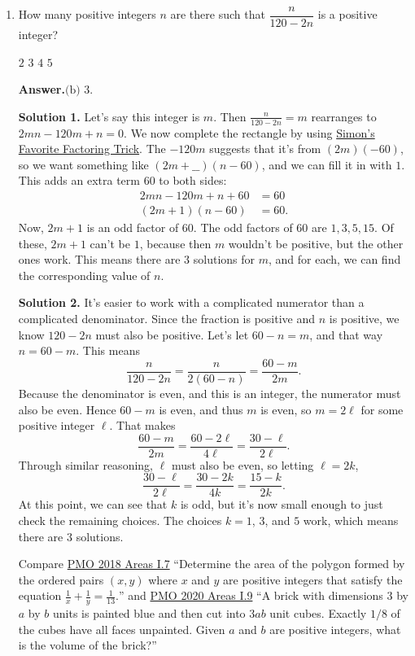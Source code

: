 \documentclass[11pt,paper=letter]{scrartcl}
\newcommand{\ansb}[2]{{\sffamily \bfseries Answer.}\;\(\boxed{\text{(#1) #2}}\).}
\newcommand{\soln}[1]{{\sffamily \bfseries Solution #1.}\;}
\newenvironment{rem}%
{\noindent \ignorespaces \small \sffamily \sansmath {\bfseries Remark.}}%
{\ignorespacesafterend}
\begin{document}
\begin{enumerate}[align=left,leftmargin=*]
\item How many positive integers $n$ are there such that $\dfrac{n}{120-2n}$ is a positive integer?

\fourch
{$2$}
{$3$}
{$4$}
{$5$}

\ansb{b}{$3$}

\soln1 Let's say this integer is $m$. Then $\frac{n}{120 - 2n} = m$ rearranges to $2mn - 120m + n = 0.$ We now complete the rectangle by using \href{https://artofproblemsolving.com/wiki/index.php/Simon%27s_Favorite_Factoring_Trick}{Simon's Favorite Factoring Trick}. The $-120m$ suggests that it's from $(2m)(-60)$, so we want something like $(2m + \_\_)(n - 60)$, and we can fill it in with $1$. This adds an extra term $60$ to both sides:
\begin{align*}
2mn - 120m + n + 60 &= 60 \\
(2m + 1)(n - 60) &= 60.
\end{align*}
Now, $2m + 1$ is an odd factor of $60$. The odd factors of $60$ are $1, 3, 5, 15$. Of these, $2m + 1$ can't be $1$, because then $m$ wouldn't be positive, but the other ones work. This means there are $3$ solutions for $m$, and for each, we can find the corresponding value of $n$.

\soln2 It's easier to work with a complicated numerator than a complicated denominator. Since the fraction is positive and $n$ is positive, we know $120 - 2n$ must also be positive. Let's let $60 - n = m$, and that way $n = 60 - m$. This means \[\dfrac{n}{120 - 2n} = \frac{n}{2(60 - n)} = \dfrac{60 - m}{2m}.\] Because the denominator is even, and this is an integer, the numerator must also be even. Hence $60 - m$ is even, and thus $m$ is even, so $m = 2\ell$ for some positive integer $\ell$. That makes \[\dfrac{60 - m}{2m} = \frac{60 - 2\ell}{4\ell} = \dfrac{30 - \ell}{2\ell}.\] Through similar reasoning, $\ell$ must also be even, so letting $\ell = 2k$, \[
  \dfrac{30 - \ell}{2\ell} = \frac{30 - 2k}{4k} = \frac{15 - k}{2k}.
\]
At this point, we can see that $k$ is odd, but it's now small enough to just check the remaining choices. The choices $k = 1$, $3$, and $5$ work, which means there are $3$ solutions.

\begin{rem}
Compare \href{https://cjquines.com/files/pmo2018areas.pdf}{PMO 2018 Areas I.7} ``Determine the area of the polygon formed by the ordered pairs $(x, y)$ where $x$ and $y$ are positive integers that satisfy the equation $\frac1x + \frac1y = \frac1{13}.$'' and \href{https://cjquines.com/files/pmo2020areas.pdf}{PMO 2020 Areas I.9} ``A brick with dimensions $3$ by $a$ by $b$ units is painted blue and then cut into $3ab$ unit cubes. Exactly $1/8$ of the cubes have all faces unpainted. Given $a$ and $b$ are positive integers, what is the volume of the brick?''
\end{rem}


\end{enumerate}
\end{document}
